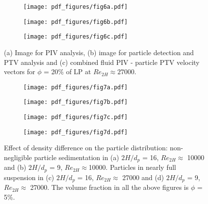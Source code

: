\documentclass{jfm}
\begin{document}
\begin{figure}
\centering
\begin{subfigure}{.3\textwidth}
  \centering
  \texttt{[image: pdf\_figures/fig6a.pdf]}
  \caption{}
  \label{fig:PIV image}
\end{subfigure}%
\begin{subfigure}{.3\textwidth}
  \centering
  \texttt{[image: pdf\_figures/fig6b.pdf]}
  \caption{}
  \label{fig:PTV image}
\end{subfigure}
\begin{subfigure}{.3\textwidth}
  \centering
  \texttt{[image: pdf\_figures/fig6c.pdf]}
  \caption{}
  \label{fig:PIV+PTV}
\end{subfigure}
\caption{(a) Image for PIV analysis, (b) image for particle detection and PTV analysis and (c) combined fluid PIV - particle PTV velocity vectors for $\phi$ = 20\% of LP at $Re_{2H}\approx27000$.}
\label{fig:PIV+PTV image and velocity vectors}
\end{figure}



\begin{figure}
\centering
\begin{subfigure}{.36\textwidth}
  \centering
  \texttt{[image: pdf\_figures/fig7a.pdf]}
  \caption{}
  \label{fig:3mm_5p_Re10000}
\end{subfigure}%
\begin{subfigure}{.36\textwidth}
  \centering
  \texttt{[image: pdf\_figures/fig7b.pdf]}
  \caption{}
  \label{fig:6mm_5p_Re10000}
\end{subfigure}
\begin{subfigure}{.36\textwidth}
  \centering
  \texttt{[image: pdf\_figures/fig7c.pdf]}
  \caption{}
  \label{fig:3mm_5p_Re27000}
\end{subfigure}%
\begin{subfigure}{.36\textwidth}
  \centering
  \texttt{[image: pdf\_figures/fig7d.pdf]}
  \caption{}
  \label{fig:6mm_5p_Re27000}
\end{subfigure}
\caption{Effect of density difference on the particle distribution: non-negligible particle sedimentation in (a) $2H/d_p$ = 16, $Re_{2H}\approx$ 10000 and (b) $2H/d_p$ = 9, $Re_{2H}\approx$10000. Particles in nearly full suspension in (c) $2H/d_p$ = 16, $Re_{2H}\approx$ 27000 and (d) $2H/d_p$ = 9, $Re_{2H}\approx$ 27000. The volume fraction in all the above figures is $\phi$ = 5\%.}
\label{fig:Velocity vectors at 2 Re}
\end{figure}
\end{document}
